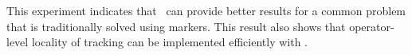 This experiment indicates that \tracker\ can provide better results for a common problem that is traditionally solved using markers. This result also shows that operator-level locality of tracking can be implemented efficiently with \tracker .







